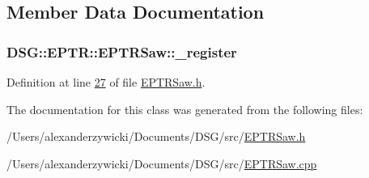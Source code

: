\subsection{Member Data Documentation}
\hypertarget{class_d_s_g_1_1_e_p_t_r_1_1_e_p_t_r_saw_a38d89a4557f487e0e447e1da6acf7e5f}{
\subsubsection[{\+\_\+register}]{ D\+S\+G\+::\+E\+P\+T\+R\+::\+E\+P\+T\+R\+Saw\+::\+\_\+register\hspace{0.3cm}{\ttfamily [protected]}}}\label{class_d_s_g_1_1_e_p_t_r_1_1_e_p_t_r_saw_a38d89a4557f487e0e447e1da6acf7e5f}


Definition at line \hyperlink{_e_p_t_r_saw_8h_source_l00027}{27} of file \hyperlink{_e_p_t_r_saw_8h_source}{E\+P\+T\+R\+Saw.\+h}.



The documentation for this class was generated from the following files\+:\begin{DoxyCompactItemize}
\item 
/\+Users/alexanderzywicki/\+Documents/\+D\+S\+G/src/\hyperlink{_e_p_t_r_saw_8h}{E\+P\+T\+R\+Saw.\+h}\item 
/\+Users/alexanderzywicki/\+Documents/\+D\+S\+G/src/\hyperlink{_e_p_t_r_saw_8cpp}{E\+P\+T\+R\+Saw.\+cpp}\end{DoxyCompactItemize}
